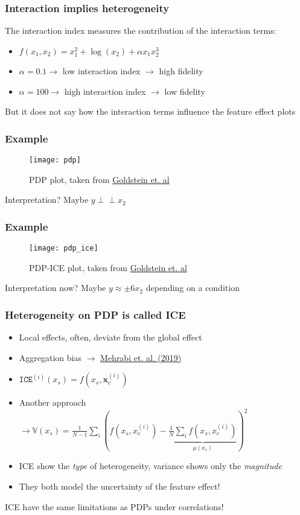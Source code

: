 \begin{frame}
  \frametitle{Interaction implies heterogeneity}
  The interaction index measures the contribution of the interaction terms:

  \begin{itemize}
    \item \(f(x_1, x_2) = x_1^2 + \log(x_2) + \alpha x_1x_2^3\)
    \item \(\alpha = 0.1 \rightarrow\) low interaction index \(\rightarrow\) high fidelity
    \item \(\alpha = 100 \rightarrow\) high interaction index \(\rightarrow\) low fidelity
    \end{itemize}
  \noindent\makebox[\linewidth]{\rule{\paperwidth}{0.4pt}}
  But it does not say how the interaction terms influence the feature effect plots
\end{frame}


\begin{frame}
  \frametitle{Example}
  \begin{figure}
    \centering
    \texttt{[image: pdp]}
    \caption{PDP plot, taken from \href{https://arxiv.org/abs/1309.6392}{Goldstein et. al}}
  \end{figure}
  \noindent\makebox[\linewidth]{\rule{\paperwidth}{0.4pt}}
  Interpretation?
  Maybe $y \perp\!\!\!\!\perp x_2$
\end{frame}

\begin{frame}
  \frametitle{Example}
  \begin{figure}
    \centering
    \texttt{[image: pdp\_ice]}
    \caption{PDP-ICE plot, taken from \href{https://arxiv.org/abs/1309.6392}{Goldstein et. al}}
  \end{figure}
  \noindent\makebox[\linewidth]{\rule{\paperwidth}{0.4pt}}
  Interpretation now? Maybe $y \approx \pm 6 x_2 $ depending on a condition
\end{frame}

\begin{frame}
  \frametitle{Heterogeneity on PDP is called ICE}
  \begin{itemize}
    \item Local effects, often, deviate from the global effect
    \item Aggregation bias $\rightarrow$ \href{https://arxiv.org/pdf/1908.09635.pdf}{Mehrabi et. al. (2019)}
    \item $\mathtt{ICE}^{(i)}(x_s) = f(x_s, \mathbf{x}_c^{(i)})$
    \item Another approach $\rightarrow \mathbb{V}(x_s) = \frac{1}{N-1}\sum_i \left ( f(x_s, x_c^{(i)}) - \underbrace{\frac{1}{N} \sum_i f(x_s, x_c^{(i)})}_{\mu(x_s)} \right)^2$
    \item ICE show the \emph{type} of heterogeneity, variance shows only the \emph{magnitude}
    \item They both model the uncertainty of the feature effect!
  \end{itemize}
  \noindent\makebox[\linewidth]{\rule{\paperwidth}{0.4pt}}
  ICE have the same limitations as PDPs under correlations!
\end{frame}

